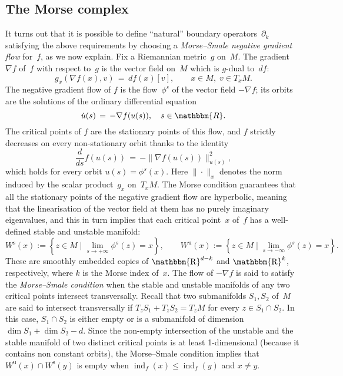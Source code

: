 \documentclass[12pt,twoside]{amsart}
\theoremstyle{plain}
\numberwithin{figure}{section}
\numberwithin{equation}{section}
\def\ss{\operatorname{s}}
\def\u{\operatorname{u}}
\def\ind{\operatorname{ind}}
\def\RR{\mathbbm{R}}
\def\R{\operatorname{\mathbbm{R}}}
\begin{document}
\subsection{The Morse complex}  \label{s:morse}
It turns out that it is possible to define ``natural'' boundary operators~$\partial_k$ satisfying the above requirements by choosing a {\em Morse--Smale negative gradient flow}\/ for~$f$, 
as we now explain. Fix a Riemannian metric~$g$ on~$M$. The gradient~$\nabla f$ of~$f$ with respect to~$g$ is the vector field on~$M$ which is $g$-dual to~$df$:
\[
g_x (\nabla f(x), v )  \,=\,  df(x)[v], \qquad x  \in M, \; v \in T_x M .
\]
The negative gradient flow of $f$ is the flow~$\phi^s$ of the vector field $-\nabla f$; its orbits are the solutions of the ordinary differential equation
\[
\dot u(s) \,=\, - \nabla f(u(s)), \quad s \in \RR . 
\]
The critical points of $f$ are the stationary points of this flow, 
and $f$ strictly decreases 
on every non-stationary orbit thanks to the identity
\[
\frac{d}{ds} f(u(s)) \,=\, - \| \nabla f(u(s)) \|_{u(s)}^2,
\]
which holds for every orbit $u(s)=\phi^s(x)$. Here $\|\cdot\|_x$ denotes the norm induced by the scalar product~$g_x$ on~$T_x M$. The Morse condition guarantees that all the stationary points of the negative gradient flow are hyperbolic, meaning that the linearisation of the vector field at them has no purely imaginary eigenvalues, and this in turn implies that each critical point~$x$ 
of~$f$ has a well-defined stable and unstable manifold:
\[
W^{\ss}(x) := \left\{ z \in M \mid \lim_{s \to +\infty} \phi^s(z) = x \right\}, 
\qquad
W^{\u}(x) := \left\{ z \in M \mid \lim_{s \to -\infty} \phi^s(z) = x \right\} .
\]
These are smoothly embedded copies of $\R^{d-k}$ and $\R^k$, respectively, where $k$ is the Morse index of~$x$. The flow of $-\nabla f$ is said to satisfy the {\em Morse--Smale condition}\/ when the stable and unstable manifolds of any two critical points intersect transversally. 
Recall that two submanifolds $S_1, S_2$ of~$M$ are said to intersect transversally
if $T_z S_1 + T_z S_2 = T_z M$ for every $z \in S_1 \cap S_2$.
In this case, $S_1 \cap S_2$ is either empty or is a submanifold of dimension 
$\dim S_1 + \dim S_2 -d$. Since the non-empty intersection of the unstable and the stable manifold of two distinct critical points is at least 1-dimensional (because it contains non constant orbits), the Morse--Smale condition implies that $W^{\u}(x) \cap W^{\ss}(y)$ 
is empty when $\ind_f(x) \leqslant \ind_f(y)$ and $x \neq y$.
\end{document}

